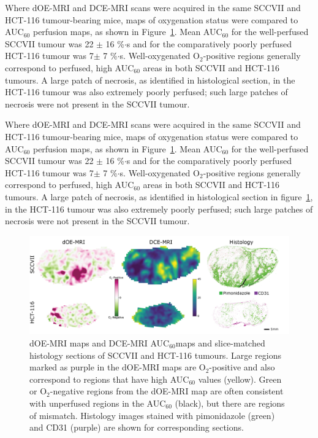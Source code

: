 Where \ac{dOE-MRI} and DCE-MRI scans were acquired in the same SCCVII and HCT-116 tumour-bearing mice,  maps of oxygenation status were compared to \acs{AUC}$_{60}$ perfusion maps, as shown in Figure~\ref{fig_perfusion}.
Mean \acs{AUC}$_{60}$ for the well-perfused SCCVII tumour was 22 $\pm$ 16 \%$\cdot$s and for the comparatively poorly perfused HCT-116 tumour was 7$\pm$ 7 \%$\cdot$s.
Well-oxygenated O$_2$-positive regions generally correspond to perfused, high \acs{AUC}$_{60}$ areas in both SCCVII and HCT-116 tumours.
A large patch of necrosis, as identified in histological section, in the HCT-116 tumour was also extremely poorly perfused; such large patches of necrosis were not present in the SCCVII tumour.

Where \acs{dOE-MRI} and \acs{DCE-MRI} scans were acquired in the same SCCVII and HCT-116 tumour-bearing mice,  maps of oxygenation status were compared to \acs{AUC}$_{60}$ perfusion maps, as shown in Figure~\ref{fig_perfusion}.
Mean \acs{AUC}$_{60}$ for the well-perfused SCCVII tumour was 22 $\pm$ 16 \%$\cdot$s and for the comparatively poorly perfused HCT-116 tumour was 7$\pm$ 7 \%$\cdot$s.
Well-oxygenated O$_2$-positive regions generally correspond to perfused, high \acs{AUC}$_{60}$ areas in both SCCVII and HCT-116 tumours.
A large patch of necrosis, as identified in histological section in figure~\ref{fig_perfusion}, in the HCT-116 tumour was also extremely poorly perfused; such large patches of necrosis were not present in the SCCVII tumour.

\begin{figure}[htbp]
   \centering
   \includegraphics[width=\textwidth]{futurework/futurework-images/fig_perfusion.png} %
   \caption{\ac{dOE-MRI} maps and DCE-MRI \acs{AUC}$_{60}$maps and slice-matched histology sections of SCCVII and HCT-116 tumours. Large regions marked as purple in the \ac{dOE-MRI} maps are O$_2$-positive and also correspond to regions that have high \acs{AUC}$_{60}$ values (yellow). Green or O$_2$-negative regions from the \acs{dOE-MRI} map are often consistent with unperfused regions in the \acs{AUC}$_{60}$ (black), but there are regions of mismatch. Histology images stained with pimonidazole (green) and CD31 (purple) are shown for corresponding sections.
   \label{fig_perfusion}}
\end{figure}

